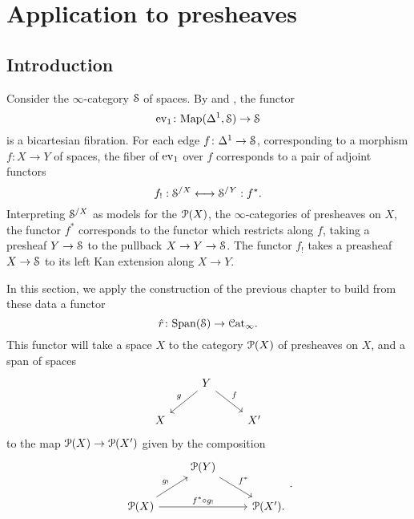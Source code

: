 \documentclass[main.tex]{subfiles}
\begin{document}
\section{Application to presheaves}
\label{sec:application_to_presheaves}

\subsection{Introduction}
\label{ssc:introduction}

Consider the $\infty$-category $\S$ of spaces. By \cite[Lemma 6.1.1.1]{highertopostheory} and \cite[Lemma 2.4.7.12]{highertopostheory}, the functor
\begin{equation}
  \label{eq:ev1}
  \ev_{1}\colon \Map(\Delta^{1}, \S) \to \S
\end{equation}
is a bicartesian fibration. For each edge $f\colon \Delta^{1} \to \S$, corresponding to a morphism $f\colon X \to Y$ of spaces, the fiber of $\ev_{1}$ over $f$ corresponds to a pair of adjoint functors
\begin{equation*}
  f_{!} : \S^{/X} \longleftrightarrow \S^{/Y} : f^{*}.
\end{equation*}
Interpreting $\S^{/X}$ as models for the $\P(X)$, the $\infty$-categories of presheaves on $X$, the functor $f^{*}$ corresponds to the functor which restricts along $f$, taking a presheaf $Y \to \S$ to the pullback $X \to Y \to \S$. The functor $f_{!}$ takes a preasheaf $X \to \S$ to its left Kan extension along $X \to Y$.

In this section, we apply the construction of the previous chapter to build from these data a functor
\begin{equation}
  \label{eq:rhat}
  \hat{r}\colon \Span(\S) \to \ICat.
\end{equation}
This functor will take a space $X$ to the category $\P(X)$ of presheaves on $X$, and a span of spaces
\begin{equation*}
  \begin{tikzcd}
    & Y
    \arrow[dl, swap, "g"]
    \arrow[dr, "f"]
    \\
    X
    && X'
  \end{tikzcd}
\end{equation*}
to the map $\P(X) \to \P(X')$ given by the composition
\begin{equation*}
  \begin{tikzcd}
    & \P(Y)
    \arrow[dr, "f^{*}"]
    \\
    \P(X)
    \arrow[ur, "g_{!}"]
    \arrow[rr, "f^{*} \circ g_{!}"]
    && \P(X').
  \end{tikzcd}.
\end{equation*}
\end{document}
